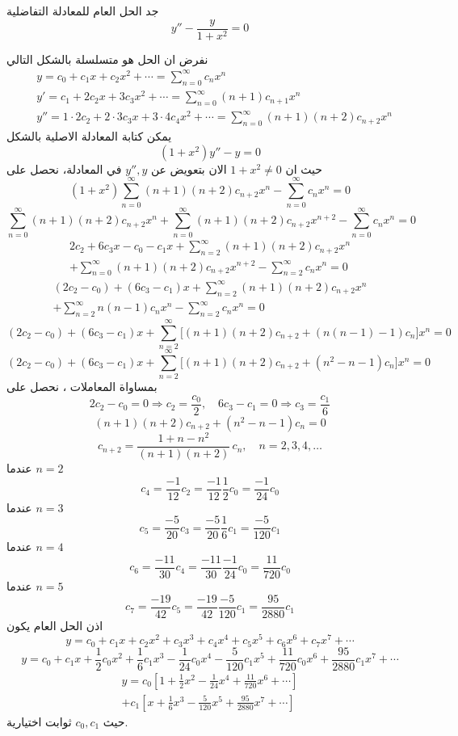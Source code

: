 \begin{example}
	جد الحل العام للمعادلة التفاضلية
	\[
	y'' - \frac{y}{1+x^2} = 0
	\]
\end{example}
\begin{solution}
		نفرض ان الحل هو متسلسلة بالشكل التالي
	\begin{align*}
		& y = c_0 + c_1 x + c_2 x^2 + \cdots = \sum_{n=0}^{\infty} c_n x^n \\[10pt]
		& y' = c_1 + 2c_2x + 3c_3 x^2 + \cdots = \sum_{n=0}^{\infty} (n+1)c_{n+1} x^n \\[10pt]
		& y'' = 1\cdot2 c_2 + 2\cdot3 c_3x + 3\cdot4 c_4 x^2 + \cdots = \sum_{n=0}^{\infty} (n+1)(n+2)c_{n+2}x^n 
	\end{align*}
يمكن كتابة المعادلة الاصلية بالشكل 
	\[
	(1+x^2)y'' - y=0
	\]
	حيث ان $1+x^2\neq 0 $ الان بتعويض عن $y'', y$ في المعادلة، نحصل على
	\[
	(1+x^2) \sum_{n=0}^{\infty} (n+1)(n+2)c_{n+2}x^n - \sum_{n=0}^{\infty}c_n x^n=0
	\]
	\[
	\sum_{n=0}^{\infty} (n+1)(n+2)c_{n+2}x^n + \sum_{n=0}^{\infty} (n+1)(n+2)c_{n+2}x^{n+2} - \sum_{n=0}^{\infty}c_n x^n=0
	\]
	\newpage
	\noindent
	\begin{multline*}
			2c_2 + 6c_3 x - c_0 - c_1 x + 	\sum_{n=2}^{\infty} (n+1)(n+2)c_{n+2}x^n \\ +\sum_{n=0}^{\infty} (n+1)(n+2)c_{n+2}x^{n+2} - \sum_{n=2}^{\infty}c_n x^n=0
	\end{multline*}
\begin{multline*}
	(2c_2 - c_0) + (6c_3 - c_1)x + \sum_{n=2}^{\infty} (n+1)(n+2)c_{n+2}x^n \\ +\sum_{n=2}^{\infty} n(n-1)c_{n}x^{n} - \sum_{n=2}^{\infty}c_n x^n=0		
\end{multline*}
\[
	(2c_2 - c_0) + (6c_3 - c_1)x + \sum_{n=2}^{\infty} \big[(n+1)(n+2)c_{n+2} + (n(n-1)-1)c_n\big]x^n =0
\]
\[
	(2c_2 - c_0) + (6c_3 - c_1)x + \sum_{n=2}^{\infty} \big[(n+1)(n+2)c_{n+2} + (n^2-n-1)c_n\big]x^n =0
\]
بمساواة المعاملات ، نحصل على
\[
2c_2 - c_0 = 0\Rightarrow c_2 = \frac{c_0}{2}, \quad 6c_3 - c_1 = 0 \Rightarrow c_3=\frac{c_1}{6}
\]
\[
(n+1)(n+2)c_{n+2} + (n^2-n-1)c_n = 0
\]
\[
c_{n+2} = \frac{1+n-n^2}{(n+1)(n+2)} \, c_n, \quad n=2,3,4,\dots
\]
عندما $n=2$ 
\[
c_4 = \frac{-1}{12}c_2 = \frac{-1}{12}\frac{1}{2}c_0 = \frac{-1}{24}c_0
\]
عندما $n=3 $
\[
c_5 = \frac{-5}{20} c_3 = \frac{-5}{20}\frac{1}{6}c_1 = \frac{-5}{120}c_1 
\]
عندما $n=4 $ 
\[
c_6 = \frac{-11}{30}c_4 = \frac{-11}{30} \frac{-1}{24}c_0 = \frac{11}{720} c_0
\]
عندما $n=5 $ 
\[
c_7 = \frac{-19}{42}c_5 = \frac{-19}{42}\frac{-5}{120} c_1 = \frac{95}{2880} c_1
\]
اذن الحل العام يكون
\[
y = c_0 + c_1 x + c_2 x^2 + c_3x^3  + c_4 x^4 + c_5 x^5 + c_6 x^6 + c_7 x^7 + \cdots 
\]
\[
y = c_0 + c_1 x + \frac{1}{2}c_0 x^2 + \frac{1}{6}c_1 x^3 - \frac{1}{24}c_0 x^4 - \frac{5}{120} c_1 x^5 + \frac{11}{720} c_0 x^6 + \frac{95}{2880} c_1 x^7 + \cdots
\]
\begin{multline*}
	y = c_0 \left[1 + \frac{1}{2} x^2 - \frac{1}{24}x^4 + \frac{11}{720} x^6 + \cdots\right] \\+ c_1 \left[x + \frac{1}{6}x^3 - \frac{5}{120} x^5 + \frac{95}{2880} x^7+ \cdots\right]
\end{multline*}
حيث $c_0, c_1 $ ثوابت اختيارية.
\end{solution}
